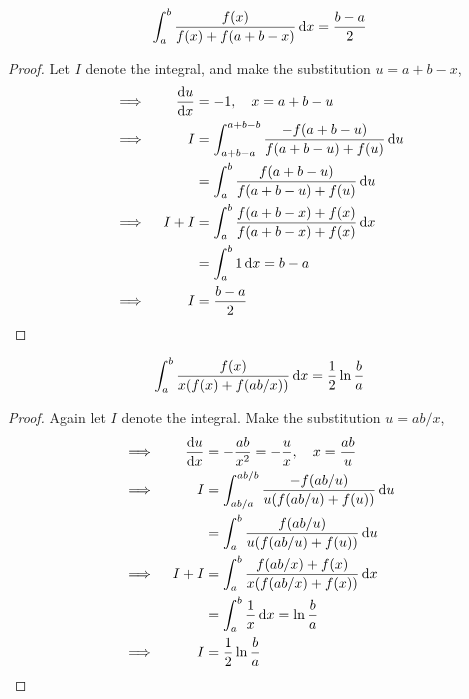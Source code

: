 \begin{theorem}
 \begin{equation*}
  \integ[a]<b>{\frac{f(x)}{f(x) + f(a + b - x)}}{x} = \frac{b - a} 2
 \end{equation*}
\end{theorem}
\begin{proof}
 Let \(I\) denote the integral, and make the substitution \(u = a + b - x\),
 \begin{alignat*}{2}
  \implies{}&& \dv<u>{x} &= -1, \quad x = a + b - u \\
  \implies{}&& I &= \integ[a + b - a]<a + b - b>{
                      \frac{-f(a + b - u)}{f(a + b - u) + f(u)}}{u} \\
  &&  &= \integ[a]<b>{\frac{f(a + b - u)}{f(a + b - u) + f(u)}}{u} \\
  \implies{}&& I + I &= \integ[a]<b>{
                      \frac{f(a + b - x) + f(x)}
                          {f(a + b - x) + f(x)}}{x} \\
  &&  &= \integ[a]<b>{1}{x} = b - a \\
  \implies{}&& I &= \frac{b - a} 2 \qedhere
 \end{alignat*}
\end{proof}
\begin{theorem}
 \begin{equation*}
  \integ[a]<b>{\frac{f(x)}{x(f(x) + f(ab / x))}}{x} = \frac 12 \ln \frac ba
 \end{equation*}
\end{theorem}
\begin{proof}
 Again let \(I\) denote the integral. Make the substitution \(u = ab / x\),
 \begin{alignat*}{2}
  \implies{}&& \dv<u>{x} &= -\frac{ab}{x^2} = -\frac ux, \quad x = \frac{ab}u \\
  \implies{}&& I &= \integ[ab/a]<ab/b>{\frac{-f(ab / u)}{u(f(ab / u) + f(u))}
  }{u} \\
  && &= \integ[a]<b>{\frac{f(ab / u)}{u(f(ab / u) + f(u))}}{u} \\
  \implies{}&& I + I &= \integ[a]<b>{\frac{f(ab / x) + f(x)}
                                  {x(f(ab / x) + f(x))}}{x} \\
  && &= \integ[a]<b>{\frac 1x}{x} = \ln \frac ba \\
  \implies{}&& I &= \frac 12 \ln \frac ba \qedhere
 \end{alignat*}
\end{proof}

